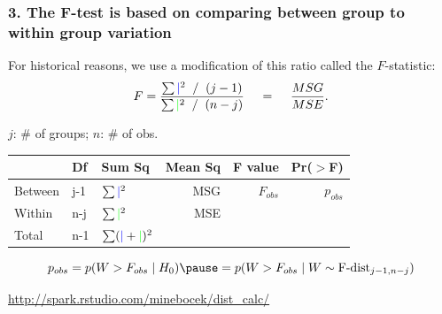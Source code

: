 \documentclass[slidestop,compress,mathserif,12pt,t,professionalfonts,xcolor=table]{beamer}
\begin{document}

\begin{frame}
  \frametitle{3. The F-test is based on comparing between group to within group variation}

For historical reasons, we use a modification of this ratio called the $F$-statistic:
\[
F = \frac{\sum {\color{blue} \mid}^2 \; \; / \; \; (j-1)}{\sum {\color{green} \mid}^2 \; \; / \; \; (n-j)}
\hspace{12pt} = \hspace{12pt} \frac{MSG}{MSE}.
\]

$j$: \# of groups; $n$: \# of obs.

\pause

\begin{center}
\small
\begin{tabular}{lllrrr}
  \hline
  & Df  & Sum Sq & Mean Sq & F value & Pr($>$F) \\ 
  \hline
  Between & j-1 & $\sum {\color{blue}\mid}^2$  & MSG & $F_{obs}$ & $p_{obs}$ \\ 
  Within  & n-j & $\sum {\color{green}\mid}^2$ & MSE &		 &  \\ 
   \hline
Total			& n-1 & $\sum ({\color{blue}\mid} + {\color{green}\mid})^2$    &                &                &
\end{tabular}
\end{center}

\pause

\[
p_{obs} = p(W > F_{obs} \mid H_0) \pause = p(W > F_{obs} \mid W \sim \textmd{F-dist}_{j-1, n-j})
\]

\centering
\url{http://spark.rstudio.com/minebocek/dist_calc/}

\end{frame}

\end{document}
